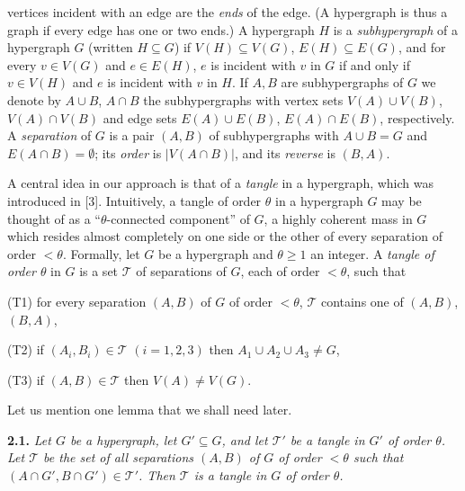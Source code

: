 \noindent vertices incident with an edge are the \textit{ends} of the edge. (A hypergraph is thus a graph if every edge has one or two ends.) A hypergraph $H$ is a \textit{subhypergraph} of a hypergraph $G$ (written $H \subseteq G$) if $V(H) \subseteq V(G)$, $E(H) \subseteq E(G)$, and for every $v \in V(G)$ and $e \in E(H)$, $e$ is incident with $v$ in $G$ if and only if $v \in V(H)$ and $e$ is incident with $v$ in $H$. If $A, B$ are subhypergraphs of $G$ we denote by $A \cup B$, $A \cap B$ the subhypergraphs with vertex sets $V(A) \cup V(B)$, $V(A) \cap V(B)$ and edge sets $E(A) \cup E(B)$, $E(A) \cap E(B)$, respectively. A \textit{separation} of $G$ is a pair $(A, B)$ of subhypergraphs with $A \cup B = G$ and $E(A \cap B) = \emptyset$; its \textit{order} is $|V(A \cap B)|$, and its \textit{reverse} is $(B, A)$.

A central idea in our approach is that of a \textit{tangle} in a hypergraph, which was introduced in [3]. Intuitively, a tangle of order $\theta$ in a hypergraph $G$ may be thought of as a ``$\theta$-connected component'' of $G$, a highly coherent mass in $G$ which resides almost completely on one side or the other of every separation of order $<\theta$. Formally, let $G$ be a hypergraph and $\theta \ge 1$ an integer. A \textit{tangle of order $\theta$} in $G$ is a set $\mathscr{T}$ of separations of $G$, each of order $<\theta$, such that

\hspace*{12pt}(T1) for every separation $(A, B)$ of $G$ of order $<\theta$, $\mathscr{T}$ contains one of $(A, B)$, $(B, A)$,

\hspace*{12pt}(T2) if $(A_i, B_i) \in \mathscr{T}$ $(i = 1, 2, 3)$ then $A_1 \cup A_2 \cup A_3 \ne G$,

\hspace*{12pt}(T3) if $(A, B) \in \mathscr{T}$ then $V(A) \ne V(G)$.

Let us mention one lemma that we shall need later.

\textbf{2.1.} \textit{Let $G$ be a hypergraph, let $G' \subseteq G$, and let $\mathscr{T}'$ be a tangle in $G'$ of order $\theta$. Let $\mathscr{T}$ be the set of all separations $(A, B)$ of $G$ of order $<\theta$ such that $(A \cap G', B \cap G') \in \mathscr{T}'$. Then $\mathscr{T}$ is a tangle in $G$ of order $\theta$.}

